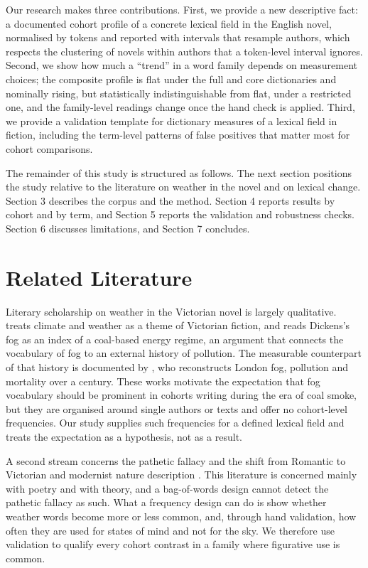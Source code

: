 \documentclass[11pt]{article}
\begin{document}
Our research makes three contributions. First, we provide a new descriptive fact: a documented cohort profile of a concrete lexical field in the English novel, normalised by tokens and reported with intervals that resample authors, which respects the clustering of novels within authors that a token-level interval ignores. Second, we show how much a ``trend'' in a word family depends on measurement choices; the composite profile is flat under the full and core dictionaries and nominally rising, but statistically indistinguishable from flat, under a restricted one, and the family-level readings change once the hand check is applied. Third, we provide a validation template for dictionary measures of a lexical field in fiction, including the term-level patterns of false positives that matter most for cohort comparisons.

The remainder of this study is structured as follows. The next section positions the study relative to the literature on weather in the novel and on lexical change. Section 3 describes the corpus and the method. Section 4 reports results by cohort and by term, and Section 5 reports the validation and robustness checks. Section 6 discusses limitations, and Section 7 concludes.

\section{Related Literature}

Literary scholarship on weather in the Victorian novel is largely qualitative. \citet{waugh2008talking} treats climate and weather as a theme of Victorian fiction, and \citet{laughlin2020fog} reads Dickens's fog as an index of a coal-based energy regime, an argument that connects the vocabulary of fog to an external history of pollution. The measurable counterpart of that history is documented by \citet{hanlon2018london}, who reconstructs London fog, pollution and mortality over a century. These works motivate the expectation that fog vocabulary should be prominent in cohorts writing during the era of coal smoke, but they are organised around single authors or texts and offer no cohort-level frequencies. Our study supplies such frequencies for a defined lexical field and treats the expectation as a hypothesis, not as a result.

A second stream concerns the pathetic fallacy and the shift from Romantic to Victorian and modernist nature description \citep{morris1955ruskin, hopps2015the, lichtenstein2020artistic}. This literature is concerned mainly with poetry and with theory, and a bag-of-words design cannot detect the pathetic fallacy as such. What a frequency design can do is show whether weather words become more or less common, and, through hand validation, how often they are used for states of mind and not for the sky. We therefore use validation to qualify every cohort contrast in a family where figurative use is common.
\end{document}
